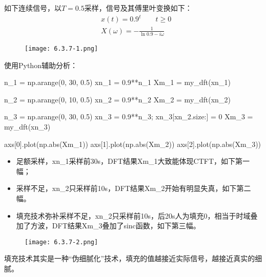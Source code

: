 如下连续信号，以$T=0.5$采样，信号及其傅里叶变换如下：
\begin{align*}
&x\left( t \right) =0.9^t \qquad t\geqslant 0 \\
&X\left( \omega \right) =-\frac{1}{\ln 0.9-i\omega}
\end{align*}
\begin{figure}[h]
\centering
\texttt{[image: 6.3.7-1.png]}
\end{figure}

使用Python辅助分析：
\begin{python}
n_1  = np.arange(0, 30, 0.5)
xn_1 = 0.9**n_1
Xm_1 = my_dft(xn_1)

n_2  = np.arange(0, 10, 0.5)
xn_2 = 0.9**n_2
Xm_2 = my_dft(xn_2)

n_3  = np.arange(0, 30, 0.5)
xn_3 = 0.9**n_3; xn_3[xn_2.size:] = 0
Xm_3 = my_dft(xn_3)

axs[0].plot(np.abs(Xm_1))
axs[1].plot(np.abs(Xm_2))
axs[2].plot(np.abs(Xm_3))
\end{python}

\begin{itemize}
    \item 足额采样，xn\_1采样前30s，DFT结果Xm\_1大致能体现CTFT，如下第一幅；
    \item 采样不足，xn\_2只采样前10s，DFT结果Xm\_2开始有明显失真，如下第二幅。
    \item 填充技术弥补采样不足，xn\_2只采样前10s，后20s人为填充0，相当于时域叠加了方波，DFT结果Xm\_3叠加了sinc函数，如下第三幅。
\end{itemize}

\begin{figure}[h]
\centering
\texttt{[image: 6.3.7-2.png]}
\end{figure}

填充技术其实是一种“伪细腻化”技术，填充的值越接近实际信号，越接近真实的细腻。




